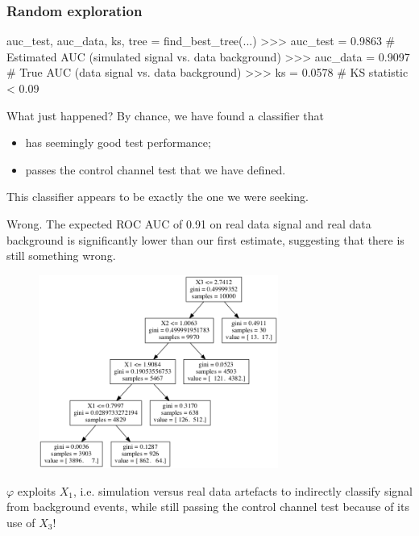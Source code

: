 \documentclass{beamer}
\begin{document}

\begin{frame}[fragile]
\frametitle{Random exploration}

{\scriptsize
\begin{pythoncode}
auc_test, auc_data, ks, tree = find_best_tree(...)
>>> auc_test = 0.9863  # Estimated AUC (simulated signal vs. data background)
>>> auc_data = 0.9097  # True AUC (data signal vs. data background)
>>> ks = 0.0578        # KS statistic < 0.09
\end{pythoncode}
}

\vspace{0.5cm}

What just happened? By chance, we have found a classifier that
\begin{itemize}
\item has seemingly good test performance;
\item passes the control channel test that we have defined.
\end{itemize}
{\color{blue} This classifier appears to be exactly the one we were seeking}.

\vspace{0.5cm}

{\color{red}Wrong}. The expected ROC AUC of 0.91 on real data signal and real
data background is significantly lower than our first estimate, suggesting that
there is still something wrong.

\end{frame}


\begin{frame}
\begin{figure}
\centering
\includegraphics[width=0.7\textwidth]{figures/tree.png}
\end{figure}

$\varphi$ exploits $X_1$, i.e. simulation versus real data
artefacts to indirectly classify signal from background events, {\color{red}while still passing the
control channel test} because of its use of $X_3$!

\end{frame}
\end{document}
